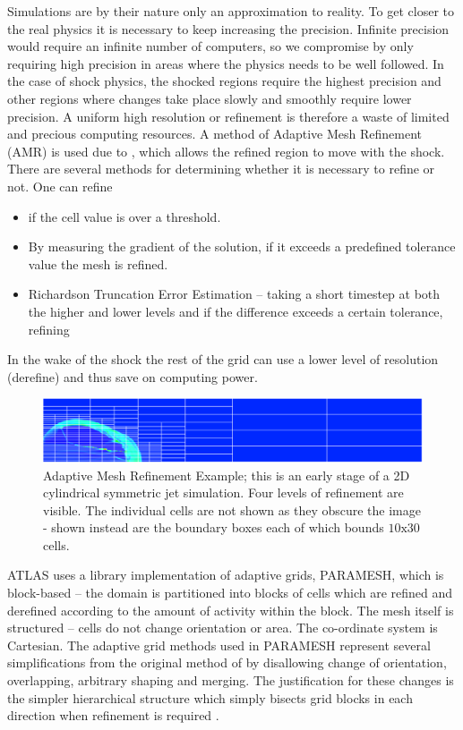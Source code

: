 Simulations are by their nature only an approximation to reality.
To get closer to the real physics it is necessary to keep increasing the precision.
Infinite precision would require an infinite number of computers, so we compromise by only requiring high precision in areas where the physics needs to be well followed. In the case of shock physics, the shocked regions require the highest precision and other regions where changes take place slowly and smoothly require lower precision.
A uniform high resolution or refinement is therefore a waste of limited and precious computing resources. 
A method of Adaptive Mesh Refinement (AMR) is used due to \citep{Berger84:_adapti,1989JCoPh..82...64B}, which allows the refined region to move with the shock. 
There are several methods for determining whether it is necessary to refine or not.
One can refine 
\begin{itemize}
\item if the cell value is over a threshold.
\item By measuring the gradient of the solution, if it exceeds a predefined tolerance value the mesh is refined.
\item Richardson Truncation Error Estimation -- taking a short timestep at both the higher and lower levels and if the difference exceeds a certain tolerance, refining
\end{itemize}
In the wake of the shock the rest of the grid can use a lower level of resolution (derefine) and thus save on computing power. 
\begin{figure}[t]
\centering
\includegraphics[width=15cm]{amr}
\caption{
Adaptive Mesh Refinement Example; this is an early stage of a 2D cylindrical symmetric jet simulation. Four levels of refinement are visible. The individual cells are not shown as they obscure the image - shown instead are the boundary boxes each of which bounds $10\mathrm{x}30$ cells.
}
\label{fig:2-3} %
\end{figure}
ATLAS uses a library implementation of adaptive grids, PARAMESH, \citep{par:00} which is block-based -- the domain is partitioned into blocks of cells which are refined and derefined according to the amount of activity within the block. The mesh itself is structured -- cells do not change orientation or area. The co-ordinate system is Cartesian.
The adaptive grid methods used in PARAMESH represent several simplifications from the original method of \citet{Berger84:_adapti,1989JCoPh..82...64B} by disallowing change of orientation, overlapping, arbitrary shaping and merging. 
The justification for these changes is the simpler hierarchical structure which simply bisects grid blocks in each direction when refinement is required \citep{DeZeeuw93:_an_ada}.


